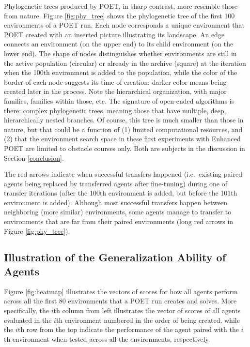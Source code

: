 \documentclass{article}
\newcommand{\rwang}[1]{\comments{\textcolor{blue}{[Rui: #1]}}}
\newcommand{\comments}[1]{#1} %
\begin{document}
Phylogenetic trees produced by POET, in sharp contrast, more resemble those from nature. Figure \ref{fig:phy_tree} shows the phylogenetic tree of the first 100 environments of a POET run. Each node corresponds a unique environment that POET created with an inserted picture illustrating its landscape. An edge connects an environment (on the upper end) to its child environment (on the lower end). The shape of nodes distinguishes whether environments are still in the active population (circular) or already in the archive (square) at the iteration when the 100th environment is added to the population, while the color of the border of each node suggests its time of creation: darker color means being created later in the process. Note the hierarchical organization, with major families, families within those, etc. The signature of open-ended algorithms is there: complex phylogenetic trees, meaning those that have multiple, deep, hierarchically nested branches. Of course, this tree is much smaller than those in nature, but that could be a function of (1) limited computational resources, and (2) that the environment search space in these first experiments with Enhanced POET are limited to obstacle courses only. Both are subjects in the discussion in Section \ref{conclusion}.

The red arrows indicate when successful transfers happened (i.e.\ existing paired agents being replaced by transferred agents after fine-tuning) during one of transfer iterations (after the 100th environment is added, but before the 101th environment is added). Although most successful transfers happen between neighboring (more similar) environments, some agents manage to transfer to environments that are far from their paired environments (long red arrows in Figure \ref{fig:phy_tree}).





\subsection{Illustration of the Generalization Ability of Agents}
\label{appendix:pata_matrix}

 
Figure \ref{fig:heatmap} illustrates the vectors of scores for how all agents perform across all the first 80 environments that a POET run creates and solves. More specifically, the $i$th column from left illustrates the vector of scores of all agents evaluated in the $i$th environment numbered in the order of being created, while the $i$th row from the top indicate the performance of the agent paired with the $i$th environment when tested across all the environments, respectively. 
\end{document}
